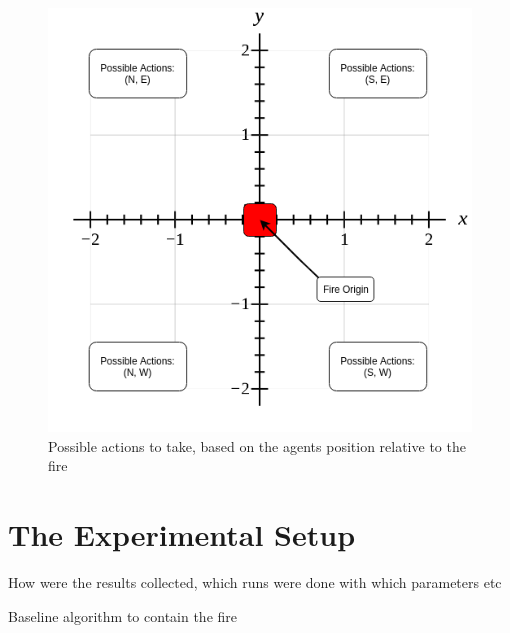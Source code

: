 \begin{figure}[h]
    \centering
    \includegraphics[width=1\linewidth]{img/Demo-data_Baseline.png}
    \caption{Possible actions to take, based on the agents position relative to the fire}
    \label{fig:demodata}
\end{figure}




\section{The Experimental Setup}\label{sec:experiment}
How were the results collected, which runs were done with which parameters etc

\begin{algorithm}
  \caption{Baseline algorithm to contain the fire}
  \label{alg:baseline}
  \begin{algorithmic}[1]
    \EndIf
    \EndWhile
    \State {}
    \EndProcedure
  \end{algorithmic}
\end{algorithm}

